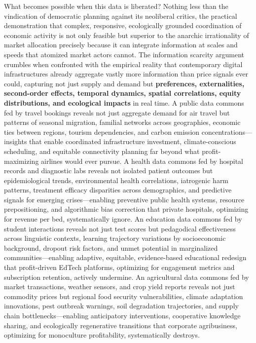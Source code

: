 What becomes possible when this data is liberated? Nothing less than the
vindication of democratic planning against its neoliberal critics, the
practical demonstration that complex, responsive, ecologically grounded
coordination of economic activity is not only feasible but superior to
the anarchic irrationality of market allocation precisely because it can
integrate information at scales and speeds that atomized market actors
cannot. The information scarcity argument crumbles when confronted with
the empirical reality that contemporary digital infrastructures already
aggregate vastly more information than price signals ever could,
capturing not just supply and demand but \textbf{preferences,
externalities, second-order effects, temporal dynamics, spatial
correlations, equity distributions, and ecological impacts} in real
time. A public data commons fed by travel bookings reveals not just
aggregate demand for air travel but patterns of seasonal migration,
familial networks across geographies, economic ties between regions,
tourism dependencies, and carbon emission concentrations---insights that
enable coordinated infrastructure investment, climate-conscious
scheduling, and equitable connectivity planning far beyond what
profit-maximizing airlines would ever pursue. A health data commons fed
by hospital records and diagnostic labs reveals not isolated patient
outcomes but epidemiological trends, environmental health correlations,
iatrogenic harm patterns, treatment efficacy disparities across
demographics, and predictive signals for emerging crises---enabling
preventive public health systems, resource prepositioning, and
algorithmic bias correction that private hospitals, optimizing for
revenue per bed, systematically ignore. An education data commons fed by
student interactions reveals not just test scores but pedagodical
effectiveness across linguistic contexts, learning trajectory variations
by socioeconomic background, dropout risk factors, and unmet potential
in marginalized communities---enabling adaptive, equitable,
evidence-based educational redesign that profit-driven EdTech platforms,
optimizing for engagement metrics and subscription retention, actively
undermine. An agricultural data commons fed by market transactions,
weather sensors, and crop yield reports reveals not just commodity
prices but regional food security vulnerabilities, climate adaptation
innovations, pest outbreak warnings, soil degradation trajectories, and
supply chain bottlenecks---enabling anticipatory interventions,
cooperative knowledge sharing, and ecologically regenerative transitions
that corporate agribusiness, optimizing for monoculture profitability,
systematically destroys.

